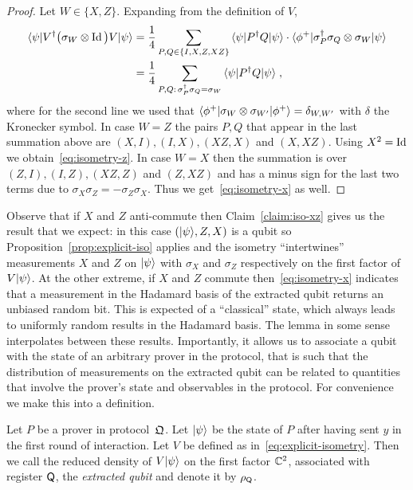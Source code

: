 \begin{proof}
Let $W\in\{X,Z\}$. Expanding from the definition of $V$,
\begin{align*}
\langle\psi| V^\dagger \big(\sigma_W \otimes \mathop{\rm Id}\nolimits\big) V |\psi\rangle
&= \frac{1}{4}\sum_{P,Q\in \{I,X,Z,XZ\}} \,\langle\psi| P^\dagger Q |\psi\rangle\cdot \langle\phi^+| \sigma_P^\dagger \sigma_Q \otimes \sigma_W |\psi\rangle\\
&= \frac{1}{4}\sum_{P,Q:\, \sigma_P^\dagger \sigma_Q = \sigma_W} \,\langle\psi| P^\dagger Q |\psi\rangle\;,
\end{align*}
where for the second line we used that $\langle\phi^+| \sigma_W \otimes \sigma_{W'} |\phi^+\rangle = \delta_{W,W'}$ with $\delta$ the Kronecker symbol. In case $W=Z$ the pairs $P,Q$ that appear in the last summation above are $(X,I),(I,X),(XZ,X)$ and $(X,XZ)$. Using $X^2 = \mathop{\rm Id}\nolimits$ we obtain~\eqref{eq:isometry-z}. In case $W=X$ then the summation is over $(Z,I),(I,Z),(XZ,Z)$ and $(Z,XZ)$ and has a minus sign for the last two terms due to $\sigma_X\sigma_Z = -\sigma_Z\sigma_X$. Thus we get~\eqref{eq:isometry-x} as well. 
\end{proof}

Observe that if $X$ and $Z$ anti-commute then Claim~\ref{claim:iso-xz} gives us the result that we expect: in this case $(|\psi\rangle,Z,X)$ is a qubit so Proposition~\ref{prop:explicit-iso} applies and the isometry ``intertwines'' measurements $X$ and $Z$ on $|\psi\rangle$ with $\sigma_X$ and $\sigma_Z$ respectively on the first factor of $V|\psi\rangle$. At the other extreme, if $X$ and $Z$ commute then~\eqref{eq:isometry-x} indicates that a measurement in the Hadamard basis of the extracted qubit returns an unbiased random bit. This is expected of a ``classical'' state, which always leads to uniformly random results in the Hadamard basis. The lemma in some sense interpolates between these results. Importantly, it allows us to associate a qubit with the state of an arbitrary prover in the protocol, that is such that the distribution of measurements on the extracted qubit can be related to  quantities that involve the prover's state and observables in the protocol. For convenience we make this into a definition. 

\begin{definition}\label{def:extracted-qubit}
Let $P$ be a prover in protocol~$\mathfrak{Q}$. Let $|\psi\rangle$ be the state of $P$ after having sent $y$ in the first round of interaction. Let $V$ be defined as in~\eqref{eq:explicit-isometry}. Then we call the reduced density of $V|\psi\rangle$ on the first factor $\mathbb{C}^2$, associated with register ${\textsf{Q}}$, the \emph{extracted qubit} and denote it by $\rho_{\textsf{Q}}$. 
\end{definition}

